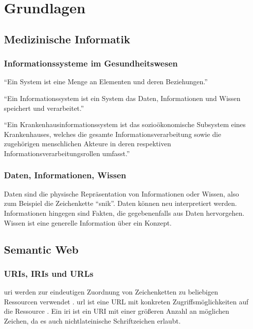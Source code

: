 \chapter{Grundlagen}\label{ch:preliminaries}

\section{Medizinische Informatik}

\subsection{Informationssysteme im Gesundheitswesen}

\begin{definition}[System]
\enquote{Ein System ist eine Menge an Elementen und deren Beziehungen.} \citep[S.~30]{bb}
\end{definition}
\begin{definition}[Informationssystem]
\enquote{Ein Informationssystem ist ein System das Daten, Informationen und Wissen speichert und verarbeitet.} \citep[S.~30]{bb}
\end{definition}

\begin{definition}
\enquote{Ein Krankenhausinformationssystem ist das sozioökonomische Subsystem eines Krankenhauses, welches die gesamte Informationsverarbeitung sowie die zugehörigen menschlichen Akteure in deren respektiven Informationsverarbeitungsrollen umfasst.} \citep[S.~37]{bb}
\end{definition}

\subsection{Daten, Informationen, Wissen}
Daten sind die physische Repräsentation von Informationen oder Wissen, also zum Beispiel die Zeichenkette \enquote{\ac{snik}}. Daten können neu interpretiert werden.
Informationen hingegen sind Fakten, die gegebenenfalls aus Daten hervorgehen.
Wissen ist eine generelle Information über ein Konzept. \citep[S.~29]{bb}

\section{Semantic Web}

\subsection{URIs, IRIs und URLs}
\ac{uri} werden zur eindeutigen Zuordnung von Zeichenketten zu beliebigen Ressourcen verwendet \citep{uri}.
\ac{url} ist eine URL mit konkreten Zugriffsmöglichkeiten auf die Ressource \citep{url}.
Ein \ac{iri} ist ein URI mit einer größeren Anzahl an möglichen Zeichen, da es auch nichtlateinische Schriftzeichen erlaubt.

